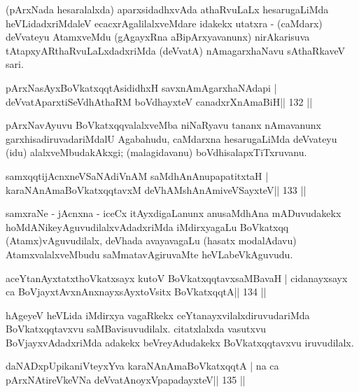 \begin{artha}
(pArxNada hesaralalxda) aparxsidadhxvAda athaRvuLaLx hesarugaLiMda  heVLidadxriMdaleV ecacxrAgalilalxveMdare idakekx utatxra - (caMdarx) deVvateyu AtamxveMdu (gAgayxRna aBipArxyavanunx) nirAkarisuva tAtapxyARthaRvuLaLxdadxriMda (deVvatA) nAma\-garxhaNavu sAthaRkaveV sari.
\end{artha}


\begin{shl}
pArxNasAyxBoVkatxqqtAsididhxH savxnAmAgarxhaNAdapi |
deVvatAparxtiSeVdhAthaRM boVdhayxteV  canadxrXnAmaBiH\hfill || 132 ||
\end{shl}

\begin{artha}
pArxNavAyuvu BoVkatxqqvalalxveMba niNaRyavu tananx nAmavanunx garxhisadiruvadariMdalU Agabahudu, caMdarxna hesarugaLiMda deVvateyu (idu) alalxveMbudakAkxgi; (malagidavanu) boVdhisalapxTiTxruvanu.
\end{artha}


\begin{shl}
samxqqtijAcnxneVSaNAdiVnAM saMdhAnAnupapatitxtaH |
karaNAnAmaBoVkatxqqtavxM deVhAMshAnAmiveVSayxteV\hfill || 133 ||
\end{shl}

\begin{artha}
samxraNe - jAcnxna - iceCx itAyxdigaLanunx anusaMdhAna mADuvudakekx hoMdANikeyAguvudilalxvAdadxriMda iMdirxyagaLu BoVkatxqq (Atamx)vAguvudilalx, deVhada avayavagaLu (hasatx modalAdavu) AtamxvalalxveMbudu saMmatavAgiruvaMte heVLabeVkAguvudu.
\end{artha}

\begin{shl}
aceYtanAyxtatxthoVkatxsayx kutoV BoVkatxqqtavxsaMBavaH |
cidanayxsayx ca BoVjayxtAvxnAnxnayxsAyxtoV\s sitx BoVkatxqqtA\hfill || 134 ||
\end{shl}

\begin{artha}
hAgeyeV heVLida iMdirxya vagaRkekx ceYtanayxvilalxdiruvudariMda  BoVkatxqqtavxvu saMBavisuvudilalx. citatxlalxda vasutxvu BoVjayxvAdadxriMda adakekx beVreyAdudakekx BoVkatxqqtavxvu iruvudilalx.
\end{artha}

\begin{shl}
daNADxpUpikaniVteyxYva karaNAnAmaBoVkatxqqtA |
na ca pArxNAtireVkeVNa deVvatA\s noyxVpapadayxteV\hfill || 135 ||
\end{shl}

